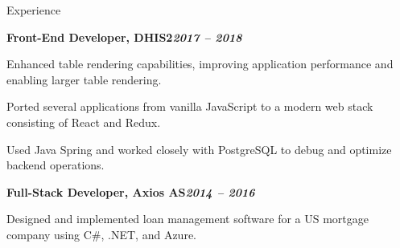 \begin{rubric}{Experience}
\begin{compactitem}
    \vspace{-12pt}
\end{compactitem}
%
\entry*[]%
\textbf{Front-End Developer, DHIS2\hfill\textit{2017 -- 2018}} \par
    \begin{compactitem}
    \item Enhanced table rendering capabilities, improving application performance and enabling larger table rendering.
    \item Ported several applications from vanilla JavaScript to a modern web stack consisting of React and Redux.
    \item Used Java Spring and worked closely with PostgreSQL to debug and optimize backend operations.
    \vspace{-12pt}
\end{compactitem}
%
\entry*[]%
\textbf{Full-Stack Developer, Axios AS\hfill\textit{2014 -- 2016}} \par
\begin{compactitem}
    \item Designed and implemented loan management software for a US mortgage company using C\#, .NET, and Azure.
    \vspace{-12pt}
\end{compactitem}
%
\end{rubric}